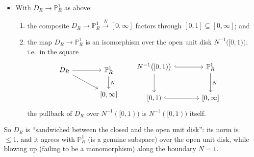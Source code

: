 \begin{itemize}
\item[\textbf{Axiom 4.}] With $D_R\to\mathbb P^1_R$ as above:
\begin{enumerate}
\item[(4a)] the composite $D_R\to\mathbb P^1_R\xrightarrow{N}[0,\infty]$ factors
through $[0,1]\subseteq[0,\infty]$; and
\item[(4b)] the map $D_R\to\mathbb P^1_R$ is an isomorphism over the open unit
disk $N^{-1}\bigl([0,1)\bigr)$; i.e.\ in the square
\begin{equation*}
\begin{tikzcd}[column sep=large]
D_R \arrow[r] \arrow[rd] & \mathbb P^1_R \arrow[d, "N"] \\
& {[0,\infty]}
\end{tikzcd}
\qquad
\begin{tikzcd}[column sep=large, row sep=large]
N^{-1}\bigl([0,1)\bigr) \arrow[r, hook] \arrow[d] & \mathbb P^1_R
\arrow[d, "N"] \\
{[0,1)} \arrow[r, hook] & {[0,\infty]}
\end{tikzcd}
\end{equation*}
the pullback of $D_R$ over $N^{-1}([0,1))$ is $N^{-1}([0,1))$ itself.
\end{enumerate}
\end{itemize}

So $D_R$ is ``sandwiched between the closed and the open unit disk'': its norm is
$\le 1$, and it agrees with $\mathbb P^1_R$ (is a genuine subspace) over the open
unit disk, while blowing up (failing to be a monomorphism) along the boundary
$N=1$.

